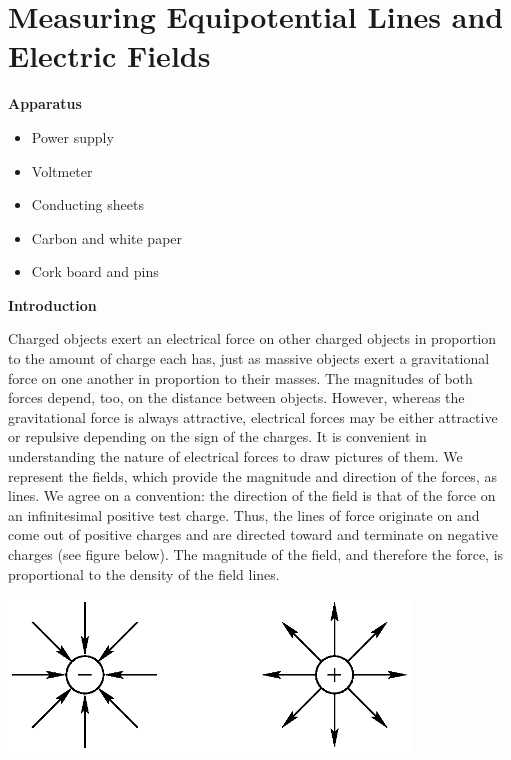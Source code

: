 \section{Measuring Equipotential Lines and Electric Fields}

\makelabheader %


\bigskip
\textbf{Apparatus}
\begin{itemize}[nosep]
\item Power supply
\item Voltmeter
\item Conducting sheets
\item Carbon and white paper
\item Cork board and pins
\end{itemize}

\medskip

\textbf{Introduction}

Charged objects exert an electrical force on other charged objects
in proportion to the amount of charge each has, just as massive objects
exert a gravitational force on one another in proportion to their
masses. The magnitudes of both forces depend, too, on the distance
between objects. However, whereas the gravitational force is always
attractive, electrical forces may be either attractive or repulsive
depending on the sign of the charges. It is convenient in understanding
the nature of electrical forces to draw pictures of them. We represent
the fields, which provide the magnitude and direction of the forces,
as lines. We agree on a convention: the direction of the field is
that of the force on an infinitesimal positive test charge. Thus,
the lines of force originate on and come out of positive charges and
are directed toward and terminate on negative charges (see figure
below). The magnitude of the field, and therefore the force, is proportional
to the density of the field lines.

{\centering \includegraphics[height=1.6in]{electric_fields_and_equipotential_lines/ef_equipot_lines_fig_1.eps} \par}

